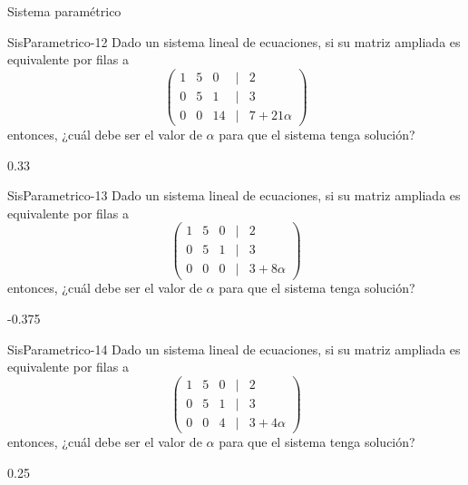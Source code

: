 \documentclass[a4,11pt]{aleph-notas}
\begin{document}
\begin{quiz}{Sistema paramétrico}
\begin{numerical}[tolerance=0.01]%
    {SisParametrico-12}
    Dado un sistema lineal de ecuaciones, si su matriz ampliada es equivalente por filas a 
    \[
    \begin{pmatrix}
    1 & 5 & 0 & | & 2 \\
    0 & 5 & 1 & | & 3 \\
    0 & 0 & 14 & | & 7+21\alpha
    \end{pmatrix}
    \]
    entonces, ¿cuál debe ser el valor de $\alpha$ para que el sistema tenga solución?
    \item 0.33
\end{numerical}

\begin{numerical}[tolerance=0.01]%
    {SisParametrico-13}
    Dado un sistema lineal de ecuaciones, si su matriz ampliada es equivalente por filas a 
    \[
    \begin{pmatrix}
    1 & 5 & 0 & | & 2 \\
    0 & 5 & 1 & | & 3 \\
    0 & 0 & 0 & | & 3+8\alpha
    \end{pmatrix}
    \]
    entonces, ¿cuál debe ser el valor de $\alpha$ para que el sistema tenga solución?
    \item -0.375
\end{numerical}

\begin{numerical}[tolerance=0.01]%
    {SisParametrico-14}
    Dado un sistema lineal de ecuaciones, si su matriz ampliada es equivalente por filas a 
    \[ 
    \begin{pmatrix}
    1 & 5 & 0 & | & 2 \\
    0 & 5 & 1 & | & 3 \\
    0 & 0 & 4 & | & 3+4\alpha
    \end{pmatrix}
    \]
    entonces, ¿cuál debe ser el valor de $\alpha$ para que el sistema tenga solución?
    \item 0.25
\end{numerical}
\end{quiz}
\end{document}
